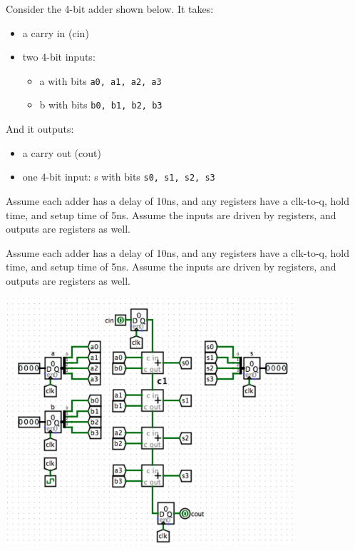 \begin{blocksection}
\question
Consider the 4-bit adder shown below. It takes:
\begin{itemize}
  \item a carry in (cin)
  \item two 4-bit inputs:
  \begin{itemize}
      \item a with bits \lstinline$a0, a1, a2, a3$
      \item b with bits \lstinline$b0, b1, b2, b3$
  \end{itemize}
\end{itemize}
And it outputs:
\begin{itemize}
  \item a carry out (cout)
  \item one 4-bit input: s with bits \lstinline$s0, s1, s2, s3$
\end{itemize}

Assume each adder has a delay of 10ns, and any registers have a clk-to-q, hold time, and setup time of 5ns. Assume the inputs are driven by registers, and outputs are registers as well.

Assume each adder has a delay of 10ns, and any registers have a clk-to-q, hold time, and setup time of 5ns. Assume the inputs are driven by registers, and outputs are registers as well.

\includegraphics[width=0.8\textwidth]{images/midterm2/adder.png}

\end{blocksection}
